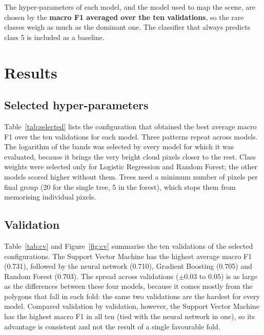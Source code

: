 \documentclass[11pt,a4paper]{article}
\begin{document}
The hyper-parameters of each model, and the model used to map the scene, are
chosen by the \textbf{macro F1 averaged over the ten validations}, so the rare
classes weigh as much as the dominant one. The classifier that always predicts
class 5 is included as a baseline.

\section{Results}

\subsection{Selected hyper-parameters}

Table~\ref{tab:selected} lists the configuration that obtained the best
average macro F1 over the ten validations for each model. Three patterns
repeat across models. The logarithm of the bands was selected by every model
for which it was evaluated, because it brings the very bright cloud pixels
closer to the rest. Class weights were selected only for Logistic Regression
and Random Forest; the other models scored higher without them. Trees need a minimum number of pixels per final group (20 for the
single tree, 5 in the forest), which stops them from memorising individual
pixels.

\begin{table}[H]
\centering\small
\caption{Selected configuration of each model.}
\label{tab:selected}

\end{table}

\subsection{Validation}

Table~\ref{tab:cv} and Figure~\ref{fig:cv} summarise the ten validations of
the selected configurations. The Support Vector Machine has the highest
average macro F1 (0.731), followed by the neural network (0.710), Gradient
Boosting (0.705) and Random Forest (0.703). The spread across validations
($\pm 0.03$ to $0.05$) is as large as the differences between these four
models, because it comes mostly from the polygons that fall in each fold: the
same two validations are the hardest for every model. Compared validation by
validation, however, the Support Vector Machine has the highest macro F1 in
all ten (tied with the neural network in one), so its advantage is consistent
and not the result of a single favourable fold.
\end{document}

